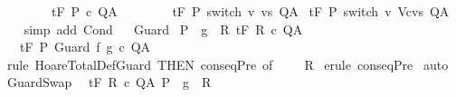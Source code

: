 \begin{isabellebody}
\ \ \ \ \ \ \ \ {\isasymGamma}{\isacharcomma}{\isasymTheta}{\isasymturnstile}\isactrlsub t\isactrlbsub {\isacharslash}F\ \isactrlesub P\ c\ Q{\isacharcomma}A{\isacharsemicolon}\isanewline
\ \ \ \ \ \ \ \ {\isasymGamma}{\isacharcomma}{\isasymTheta}{\isasymturnstile}\isactrlsub t\isactrlbsub {\isacharslash}F\ \isactrlesub P\ {\isacharparenleft}switch\ v\ vs{\isacharparenright}\ Q{\isacharcomma}A{\isasymrbrakk}\isanewline
{\isasymLongrightarrow}\ {\isasymGamma}{\isacharcomma}{\isasymTheta}{\isasymturnstile}\isactrlsub t\isactrlbsub {\isacharslash}F\ \isactrlesub P\ {\isacharparenleft}switch\ v\ {\isacharparenleft}{\isacharparenleft}V{\isacharcomma}c{\isacharparenright}{\isacharhash}vs{\isacharparenright}{\isacharparenright}\ Q{\isacharcomma}A{\isachardoublequoteclose}\isanewline
%
\isadelimproof
\ \ %
\endisadelimproof
%
\isatagproof
{}\isamarkupfalse%
\ {\isacharparenleft}simp\ add{\isacharcolon}\ Cond{\isacharparenright}%
\endisatagproof
{\isafoldproof}%
%
\isadelimproof
\isanewline
%
\endisadelimproof
\isanewline
\ \isanewline
{}\isamarkupfalse%
\ Guard{\isacharcolon}\isanewline
\ {\isachardoublequoteopen}{\isasymlbrakk}P\ {\isasymsubseteq}\ g\ {\isasyminter}\ R{\isacharsemicolon}\ {\isasymGamma}{\isacharcomma}{\isasymTheta}{\isasymturnstile}\isactrlsub t\isactrlbsub {\isacharslash}F\isactrlesub \ R\ c\ Q{\isacharcomma}A{\isasymrbrakk}\ \isanewline
\ \ {\isasymLongrightarrow}\ {\isasymGamma}{\isacharcomma}{\isasymTheta}{\isasymturnstile}\isactrlsub t\isactrlbsub {\isacharslash}F\isactrlesub \ P\ Guard\ f\ g\ c\ Q{\isacharcomma}A{\isachardoublequoteclose}\isanewline
%
\isadelimproof
%
\endisadelimproof
%
\isatagproof
{}\isamarkupfalse%
\ {\isacharparenleft}rule\ HoareTotalDef{\isachardot}Guard\ {\isacharbrackleft}THEN\ conseqPre{\isacharcomma}\ of\ {\isacharunderscore}\ {\isacharunderscore}\ {\isacharunderscore}\ {\isacharunderscore}\ R{\isacharbrackright}{\isacharparenright}\isanewline
{}\isamarkupfalse%
\ {\isacharparenleft}erule\ conseqPre{\isacharparenright}\isanewline
{}\isamarkupfalse%
\ auto\isanewline
{}\isamarkupfalse%
%
\endisatagproof
{\isafoldproof}%
%
\isadelimproof
\isanewline
%
\endisadelimproof
\isanewline
{}\isamarkupfalse%
\ GuardSwap{\isacharcolon}\isanewline
\ {\isachardoublequoteopen}{\isasymlbrakk}\ {\isasymGamma}{\isacharcomma}{\isasymTheta}{\isasymturnstile}\isactrlsub t\isactrlbsub {\isacharslash}F\isactrlesub \ R\ c\ Q{\isacharcomma}A{\isacharsemicolon}\ P\ {\isasymsubseteq}\ g\ {\isasyminter}\ R{\isasymrbrakk}\ \isanewline

\end{isabellebody}
